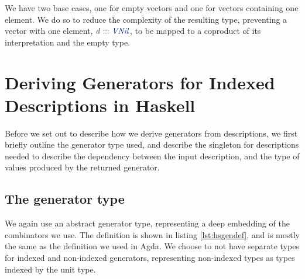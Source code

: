 \documentclass[a4paper,msc,twosized=semi]{uustthesis}
\newcommand*{\mathcolor}{}
\def\mathcolor#1#{\mathcoloraux{#1}}
\newcommand*{\mathcoloraux}[3]{%
  \protect\leavevmode
  \begingroup
    \color#1{#2}#3%
  \endgroup
}
\newcommand{\HSSym}[1]{\mathcolor{hsblue4}{#1}}
\newcommand{\HSCon}[1]{\mathcolor{hsblue3}{\mathit{#1}}}
\newcommand{\HSVar}[1]{\mathcolor{hsblue5}{\mathit{#1}}}
\begin{document}
  We have two base cases, one for empty vectors and one for vectors containing one element. We do so to reduce the complexity of the resulting type, preventing a vector with one element, \ensuremath{\HSVar{d}\HSSym{:::}\HSCon{VNil}}, to be mapped to a coproduct of its interpretation and the empty type. 

\section{Deriving Generators for Indexed Descriptions in Haskell}

  Before we set out to describe how we derive generators from descriptions, we first briefly outline the generator type used, and describe the singleton for descriptions needed to describe the dependency between the input description, and the type of values produced by the returned generator. 

\subsection{The generator type}

  We again use an abstract generator type, representing a deep embedding of the combinators we use. The definition is shown in listing \ref{lst:hsgendef}, and is mostly the same as the definition we used in Agda. We choose to not have separate types for indexed and non-indexed generators, representing non-indexed types as types indexed by the unit type. 
\end{document}
